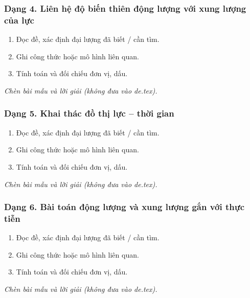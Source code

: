 \subsubsection{Dạng 4. Liên hệ độ biến thiên động lượng với xung lượng của lực}
\begin{phuongphap}
\begin{enumerate}
\item Đọc đề, xác định đại lượng đã biết / cần tìm.
\item Ghi công thức hoặc mô hình liên quan.
\item Tính toán và đối chiếu đơn vị, dấu.
\end{enumerate}
\end{phuongphap}
\begin{vidumau}
\textit{Chèn bài mẫu và lời giải (không đưa vào de.tex).}
\end{vidumau}

\subsubsection{Dạng 5. Khai thác đồ thị lực – thời gian}
\begin{phuongphap}
\begin{enumerate}
\item Đọc đề, xác định đại lượng đã biết / cần tìm.
\item Ghi công thức hoặc mô hình liên quan.
\item Tính toán và đối chiếu đơn vị, dấu.
\end{enumerate}
\end{phuongphap}
\begin{vidumau}
\textit{Chèn bài mẫu và lời giải (không đưa vào de.tex).}
\end{vidumau}

\subsubsection{Dạng 6. Bài toán động lượng và xung lượng gắn với thực tiễn}
\begin{phuongphap}
\begin{enumerate}
\item Đọc đề, xác định đại lượng đã biết / cần tìm.
\item Ghi công thức hoặc mô hình liên quan.
\item Tính toán và đối chiếu đơn vị, dấu.
\end{enumerate}
\end{phuongphap}
\begin{vidumau}
\textit{Chèn bài mẫu và lời giải (không đưa vào de.tex).}
\end{vidumau}

